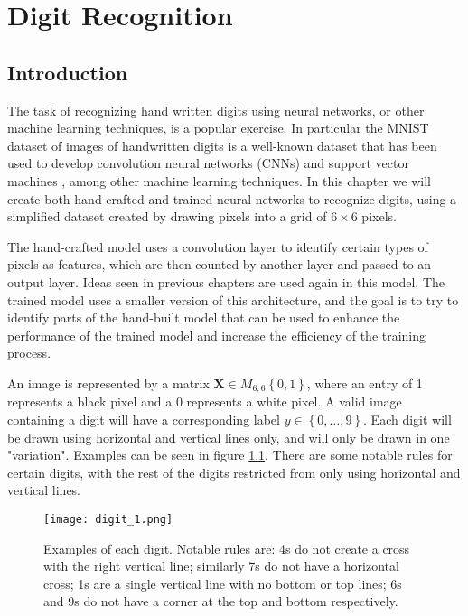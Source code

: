 \documentclass{somasmsc}
\begin{document}
\chapter{Digit Recognition}

\section{Introduction}

The task of recognizing hand written digits using neural networks, or other machine learning techniques, is a popular exercise. In particular the MNIST dataset of images of handwritten digits is a well-known dataset that has been used to develop convolution neural networks (CNNs) \citep{ciresan2011convolutional} and support vector machines \citep{platt1998using}, among other machine learning techniques. In this chapter we will create both hand-crafted and trained neural networks to recognize digits, using a simplified dataset created by drawing pixels into a grid of $6 \times 6$ pixels.

The hand-crafted model uses a convolution layer to identify certain types of pixels as features, which are then counted by another layer and passed to an output layer. Ideas seen in previous chapters are used again in this model. The trained model uses a smaller version of this architecture, and the goal is to try to identify parts of the hand-built model that can be used to enhance the performance of the trained model and increase the efficiency of the training process.

An image is represented by a matrix $\mathbf{X} \in M_{6,6}\left\{0,1\right\}$, where an entry of 1 represents a black pixel and a 0 represents a white pixel. A valid image containing a digit will have a corresponding label $y \in \left\{0, \dots, 9\right\}$. Each digit will be drawn using horizontal and vertical lines only, and will only be drawn in one "variation". Examples can be seen in figure \ref{digit:fig1}. There are some notable rules for certain digits, with the rest of the digits restricted from only using horizontal and vertical lines.

\begin{figure}[H]\label{digit:fig1}
\begin{center}
\texttt{[image: digit\_1.png]}
\end{center}
\caption{Examples of each digit. Notable rules are: 4s do not create a cross with the right vertical line; similarly 7s do not have a horizontal cross; 1s are a single vertical line with no bottom or top lines; 6s and 9s do not have a corner at the top and bottom respectively.}
\end{figure}
\end{document}
